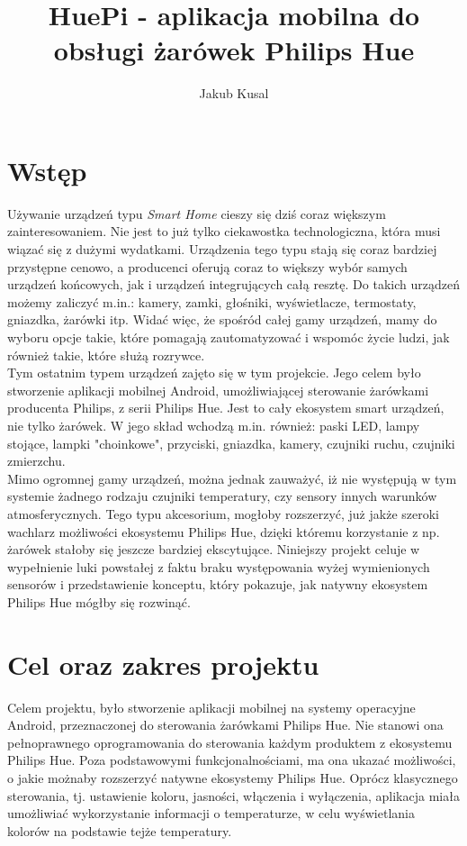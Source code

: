 \documentclass[12pt]{article}
\author{Jakub Kusal}
\title{HuePi - aplikacja mobilna do obsługi żarówek Philips Hue}
\begin{document}
\maketitle

\blankpage

\tableofcontents

\clearpage
\blankpage


\section{Wstęp}
Używanie urządzeń typu \textit{Smart Home} cieszy się dziś coraz większym zainteresowaniem. \cite{popularność-smart-home} Nie jest to już
tylko ciekawostka technologiczna, która musi wiązać się z dużymi wydatkami.
Urządzenia tego typu stają się coraz bardziej przystępne cenowo, a producenci oferują coraz to większy wybór
samych urządzeń końcowych, jak i urządzeń integrujących całą resztę. Do takich urządzeń możemy zaliczyć m.in.:
kamery, zamki, głośniki, wyświetlacze, termostaty, gniazdka, żarówki itp. Widać więc, że spośród całej gamy urządzeń, mamy do wyboru opcje takie,
które pomagają zautomatyzować i wspomóc życie ludzi, jak również takie, które służą rozrywce.\\
Tym ostatnim typem urządzeń zajęto się w tym projekcie. Jego celem było stworzenie aplikacji mobilnej Android,
umożliwiającej sterowanie żarówkami producenta Philips, z serii Philips Hue.
Jest to cały ekosystem smart urządzeń, nie tylko żarówek. W jego skład wchodzą m.in. również:
paski LED, lampy stojące, lampki "choinkowe", przyciski, gniazdka, kamery, czujniki ruchu, czujniki zmierzchu.\\
Mimo ogromnej gamy urządzeń, można jednak zauważyć, iż nie występują w tym systemie żadnego rodzaju czujniki temperatury, czy sensory innych warunków atmosferycznych.
Tego typu akcesorium, mogłoby rozszerzyć, już jakże szeroki wachlarz możliwości ekosystemu Philips Hue, dzięki któremu korzystanie z np. żarówek stałoby się jeszcze bardziej ekscytujące.
Niniejszy projekt celuje w wypełnienie luki powstałej z faktu braku występowania wyżej wymienionych sensorów i przedstawienie konceptu, który pokazuje,
jak natywny ekosystem Philips Hue mógłby się rozwinąć.


\clearpage

\section{Cel oraz zakres projektu}
Celem projektu, było stworzenie aplikacji mobilnej na systemy operacyjne Android, przeznaczonej do sterowania żarówkami Philips Hue.
Nie stanowi ona pełnoprawnego oprogramowania do sterowania każdym produktem z ekosystemu Philips Hue.
Poza podstawowymi funkcjonalnościami, ma ona ukazać możliwości, o jakie możnaby rozszerzyć natywne ekosystemy Philips Hue.
Oprócz klasycznego sterowania, tj. ustawienie koloru, jasności, włączenia i wyłączenia, aplikacja miała umożliwiać wykorzystanie informacji o temperaturze,
w celu wyświetlania kolorów na podstawie tejże temperatury.
\end{document}
